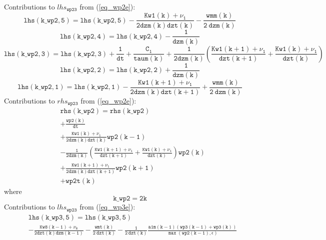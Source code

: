 \documentclass[11pt,fleqn]{article}
\begin{document}
Contributions to $lhs_{\mathtt{wp23}}$ from (\ref{eq_wp2e}):
%
\begin{equation}
\mathtt{ lhs(k\_wp2,5) = lhs(k\_wp2,5) -\frac{Kw1(k)+\nu_1}{2 dzm(k)dzt(k)} 
                                       -\frac{ wmm(k) }{ 2 \ dzm(k) }
       }
\end{equation}
%
\begin{equation}
\mathtt{ lhs(k\_wp2,4) = lhs(k\_wp2,4) - \frac{1}{dzm(k)} }
\end{equation}
%
\begin{equation}
\mathtt{ 
 lhs(k\_wp2,3) 
 = lhs(k\_wp2,3) 
 +\frac{1}{dt}
 +\frac{C_1}{taum(k)}
 +\frac{1}{2 dzm(k)} \left(  \frac{Kw1(k+1)+\nu_1}{dzt(k+1)}
                           + \frac{Kw1(k)+\nu_1}{dzt(k)} \right) }
\end{equation}
%
\begin{equation}
\mathtt{ lhs(k\_wp2,2) = lhs(k\_wp2,2) + \frac{1}{dzm(k)} }
\end{equation}
%
\begin{equation}
\mathtt{ lhs(k\_wp2,1) = lhs(k\_wp2,1) -\frac{Kw1(k+1)+\nu_1}{2 dzm(k)dzt(k+1)} 
                                       +\frac{ wmm(k) }{ 2 \ dzm(k) }
       }
\end{equation}
%
Contributions to $rhs_{\mathtt{wp23}}$ from (\ref{eq_wp2e}):
%
\begin{equation}
\begin{split}
& \mathtt{ rhs(k\_wp2) = rhs(k\_wp2) } \\
& \mathtt{
  +\frac{wp2(k)}{dt}
  } \\
& \mathtt{
  +\frac{Kw1(k)+\nu_1}{2 dzm(k)dzt(k)} wp2(k-1)
  } \\
& \mathtt{
  -\frac{1}{2 dzm(k)} \left(  \frac{Kw1(k+1)+\nu_1}{dzt(k+1)}
                            + \frac{Kw1(k)+\nu_1}{dzt(k)} \right) wp2(k)
  } \\
& \mathtt{
  +\frac{Kw1(k+1)+\nu_1}{2 dzm(k)dzt(k+1)} wp2(k+1)
  } \\
& \mathtt{
  + wp2t(k)
 }
\end{split}
\end{equation}
%
where
%
\begin{equation}
\mathtt{ k\_wp2 = 2 k}
\end{equation}
%
Contributions to $lhs_{\mathtt{wp23}}$ from (\ref{eq_wp3e}):
%
\begin{equation}
\begin{split}
& \mathtt{ lhs(k\_wp3,5) = lhs(k\_wp3,5) }\\
& \mathtt{
- \frac{Kw8(k-1)+\nu_8}{2 dzt(k)dzm(k-1)}
- \frac{ wmt(k) }{ 2 \ dzt(k) }
- \frac{1}{2 \, dzt(k)}
  \frac{ a1m(k-1)
         \left(wp3(k-1)+wp3(k)\right) }
       { \max\left( wp2(k-1), \epsilon \right) }
}
\end{split}
\end{equation}
\end{document}
